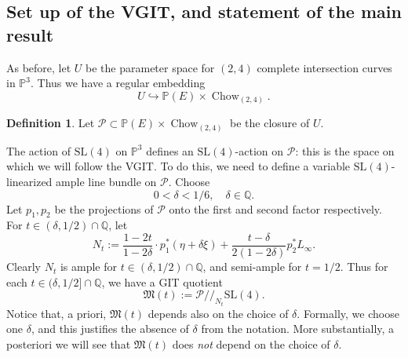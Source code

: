 \documentclass[11pt]{amsart}
\numberwithin{equation}{section}
\theoremstyle{plain}
\theoremstyle{remark}
\theoremstyle{definition}
\newtheorem{definition}[theorem]{Definition}
\newcommand{\SL}{\mathrm{SL}}
\newcommand{\gquot}{/\!\!/}
\newcommand{\cP}{{\mathscr P}}
\newcommand{\gM}{\mathfrak{M}}
\newcommand{\hra}{\hookrightarrow}
\newcommand{\PP}{{\mathbb P}}
\newcommand{\QQ}{{\mathbb Q}}
\DeclareMathOperator{\Chow}{Chow}
\begin{document}
\subsection{Set up of the VGIT, and statement of the  main result}\label{subsec:interpoldef}
%
As before, let $U$ be the parameter space for $(2,4)$ complete intersection curves in 
$\PP^3$.
Thus we have a regular embedding
%
\begin{equation}
%
U\hra \PP(E)\times\Chow_{(2,4)}.
%
\end{equation}
%
\begin{definition}\label{dfn:wpergit}
%
Let $\cP\subset  \PP(E)\times\Chow_{(2,4)}$ be the closure of $U$. 
%
\end{definition}
%
The action of $\SL(4)$ on $\PP^3$ defines an $\SL(4)$-action on $\cP$: this is the space on which we will follow the VGIT. To do this, we need to define a variable $\SL(4)$-linearized ample line bundle on $\cP$. 
Choose
%
\begin{equation}\label{ecceps}
%
0<\delta< 1/6,\quad \delta\in\QQ.
%
\end{equation}
%
Let $p_1,p_2$ be the projections of $\cP$ onto the first and second factor respectively. For $t\in(\delta,1/2)\cap \QQ$,  let
%
\begin{equation}\label{eccoenne}
%
N_t:=\frac{1-2t}{1-2\delta} \cdot p_1^{*}(\eta+\delta\xi) +\frac{t-\delta}{2(1-2\delta)}p_2^{*}L_{\infty}.
%
\end{equation}
%
Clearly $N_t$ is  ample  for  $t\in(\delta,1/2)\cap\QQ$, and   semi-ample for $t=1/2$. Thus for each  $t\in(\delta,1/2]\cap\QQ$, we have a GIT quotient
%
\begin{equation}\label{defgmt}
%
\gM(t):=\cP\gquot_{N_t}\SL(4).
%
\end{equation}
%
Notice that, a priori, $\gM(t)$ depends also on the choice of $\delta$. Formally, we choose one $\delta$, and this justifies the absence of $\delta$ from the notation. More substantially, a posteriori we will see that  $\gM(t)$ does \emph{not} depend on the choice of $\delta$.
\end{document}
